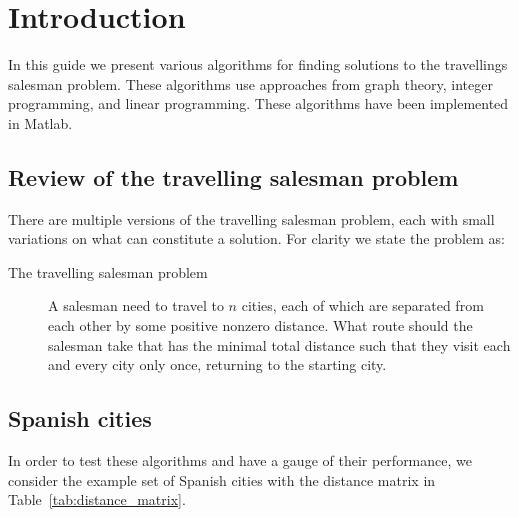 \section{Introduction}
\label{sec:introduction}

In this guide we present various algorithms for finding solutions to the travellings salesman problem. These algorithms use approaches from graph theory, integer programming, and linear programming. These algorithms have been implemented in Matlab.

\subsection{Review of the travelling salesman problem}
\label{subsec:review_of_tsp}

There are multiple versions of the travelling salesman problem, each with small variations on what can constitute a solution. For clarity we state the problem as:
\begin{description}
\item[The travelling salesman problem] A salesman need to travel to $ n $ cities, each of which are separated from each other by some positive nonzero distance. What route should the salesman take that has the minimal total distance such that they visit each and every city only once, returning to the starting city.
\end{description}


\subsection{Spanish cities}
\label{subsec:spanish_cities}

In order to test these algorithms and have a gauge of their performance, we consider the example set of Spanish cities with the  distance matrix in Table~\ref{tab:distance_matrix}.

